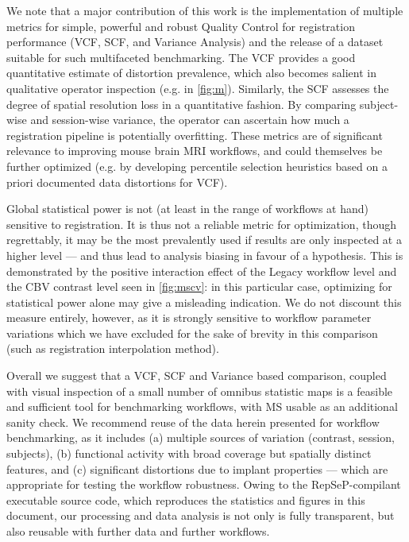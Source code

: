 We note that a major contribution of this work is the implementation of multiple metrics for simple, powerful and robust Quality Control for registration performance (VCF, SCF, and Variance Analysis) and the release of a dataset suitable for such multifaceted benchmarking.
The VCF provides a good quantitative estimate of distortion prevalence, which also becomes salient in qualitative operator inspection (e.g. in \cref{fig:m}).
Similarly, the SCF assesses the degree of spatial resolution loss in a quantitative fashion.
By comparing subject-wise and session-wise variance, the operator can ascertain how much a registration pipeline is potentially overfitting.
These metrics are of significant relevance to improving mouse brain MRI workflows, and could themselves be further optimized (e.g. by developing percentile selection heuristics based on a priori documented data distortions for VCF).

Global statistical power is not (at least in the range of workflows at hand) sensitive to registration.
It is thus not a reliable metric for optimization, though regrettably, it may be the most prevalently used if results are only inspected at a higher level --- and thus lead to analysis biasing in favour of a hypothesis.
This is demonstrated by the positive interaction effect of the Legacy workflow level and the CBV contrast level seen in \cref{fig:mscv}: in this particular case, optimizing for statistical power alone may give a misleading indication.
We do not discount this measure entirely, however, as it is strongly sensitive to workflow parameter variations which we have excluded for the sake of brevity in this comparison (such as registration interpolation method).

Overall we suggest that a VCF, SCF and Variance based comparison, coupled with visual inspection of a small number of omnibus statistic maps is a feasible and sufficient tool for benchmarking workflows, with MS usable as an additional sanity check.
We recommend reuse of the data herein presented for workflow benchmarking, as it includes (a) multiple sources of variation (contrast, session, subjects), (b) functional activity with broad coverage but spatially distinct features, and (c) significant distortions due to implant properties --- which are appropriate for testing the workflow robustness.
Owing to the RepSeP-compilant executable source code, which reproduces the statistics and figures in this document, our processing and data analysis is not only is fully transparent, but also reusable with further data and further workflows.

